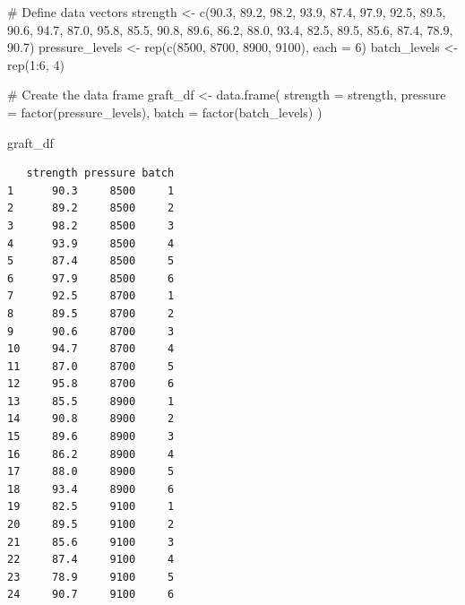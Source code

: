 \documentclass[
  letterpaper,
]{scrbook}
\newenvironment{Shaded}{\begin{snugshade}}{\end{snugshade}}
\newcommand{\AttributeTok}[1]{\textcolor[rgb]{0.40,0.45,0.13}{#1}}
\newcommand{\CommentTok}[1]{\textcolor[rgb]{0.37,0.37,0.37}{#1}}
\newcommand{\DecValTok}[1]{\textcolor[rgb]{0.68,0.00,0.00}{#1}}
\newcommand{\FloatTok}[1]{\textcolor[rgb]{0.68,0.00,0.00}{#1}}
\newcommand{\FunctionTok}[1]{\textcolor[rgb]{0.28,0.35,0.67}{#1}}
\newcommand{\NormalTok}[1]{\textcolor[rgb]{0.00,0.23,0.31}{#1}}
\newcommand{\OtherTok}[1]{\textcolor[rgb]{0.00,0.23,0.31}{#1}}
\newcommand{\SpecialCharTok}[1]{\textcolor[rgb]{0.37,0.37,0.37}{#1}}
\begin{document}
\begin{Shaded}
\begin{Highlighting}[]
\CommentTok{\# Define data vectors}
\NormalTok{strength }\OtherTok{\textless{}{-}} \FunctionTok{c}\NormalTok{(}\FloatTok{90.3}\NormalTok{, }\FloatTok{89.2}\NormalTok{, }\FloatTok{98.2}\NormalTok{, }\FloatTok{93.9}\NormalTok{, }\FloatTok{87.4}\NormalTok{, }\FloatTok{97.9}\NormalTok{,}
              \FloatTok{92.5}\NormalTok{, }\FloatTok{89.5}\NormalTok{, }\FloatTok{90.6}\NormalTok{, }\FloatTok{94.7}\NormalTok{, }\FloatTok{87.0}\NormalTok{, }\FloatTok{95.8}\NormalTok{,}
              \FloatTok{85.5}\NormalTok{, }\FloatTok{90.8}\NormalTok{, }\FloatTok{89.6}\NormalTok{, }\FloatTok{86.2}\NormalTok{, }\FloatTok{88.0}\NormalTok{, }\FloatTok{93.4}\NormalTok{,}
              \FloatTok{82.5}\NormalTok{, }\FloatTok{89.5}\NormalTok{, }\FloatTok{85.6}\NormalTok{, }\FloatTok{87.4}\NormalTok{, }\FloatTok{78.9}\NormalTok{, }\FloatTok{90.7}\NormalTok{)}
\NormalTok{pressure\_levels }\OtherTok{\textless{}{-}} \FunctionTok{rep}\NormalTok{(}\FunctionTok{c}\NormalTok{(}\DecValTok{8500}\NormalTok{, }\DecValTok{8700}\NormalTok{, }\DecValTok{8900}\NormalTok{, }\DecValTok{9100}\NormalTok{), }\AttributeTok{each =} \DecValTok{6}\NormalTok{)}
\NormalTok{batch\_levels }\OtherTok{\textless{}{-}} \FunctionTok{rep}\NormalTok{(}\DecValTok{1}\SpecialCharTok{:}\DecValTok{6}\NormalTok{, }\DecValTok{4}\NormalTok{)}

\CommentTok{\# Create the data frame}
\NormalTok{graft\_df }\OtherTok{\textless{}{-}} \FunctionTok{data.frame}\NormalTok{(}
  \AttributeTok{strength =}\NormalTok{ strength,}
  \AttributeTok{pressure =} \FunctionTok{factor}\NormalTok{(pressure\_levels),}
  \AttributeTok{batch =} \FunctionTok{factor}\NormalTok{(batch\_levels)}
\NormalTok{)}


\NormalTok{graft\_df}
\end{Highlighting}
\end{Shaded}

\begin{verbatim}
   strength pressure batch
1      90.3     8500     1
2      89.2     8500     2
3      98.2     8500     3
4      93.9     8500     4
5      87.4     8500     5
6      97.9     8500     6
7      92.5     8700     1
8      89.5     8700     2
9      90.6     8700     3
10     94.7     8700     4
11     87.0     8700     5
12     95.8     8700     6
13     85.5     8900     1
14     90.8     8900     2
15     89.6     8900     3
16     86.2     8900     4
17     88.0     8900     5
18     93.4     8900     6
19     82.5     9100     1
20     89.5     9100     2
21     85.6     9100     3
22     87.4     9100     4
23     78.9     9100     5
24     90.7     9100     6
\end{verbatim}
\end{document}
